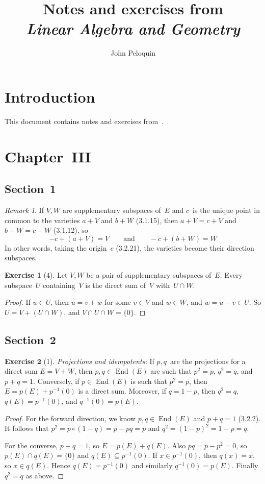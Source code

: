 \documentclass[letterpaper,12pt]{article}
\title{Notes and exercises from\\\textit{Linear Algebra and Geometry}}
\author{John Peloquin}
\date{}
\newcommand{\sect}{\cap}
\newcommand{\after}{\circ}
\DeclareMathOperator{\End}{End}
\newcommand{\inv}[1]{#1^{-1}}
\newcommand{\kerz}[1]{\inv{#1}(0)}
\theoremstyle{definition}
\newtheorem*{exer}{Exercise}
\theoremstyle{remark}
\newtheorem*{rmk}{Remark}
\begin{document}
\maketitle

\section*{Introduction}
This document contains notes and exercises from~\cite{dieudonne}.

\section*{Chapter~III}
\subsection*{Section~1}
\begin{rmk}
If \(V,W\) are supplementary subspaces of~\(E\) and \(c\)~is the unique point in common to the varieties \(a+V\) and \(b+W\) (3.1.15), then \(a+V=c+V\) and \(b+W=c+W\) (3.1.12), so
\[-c+(a+V)=V\qquad\text{and}\qquad -c+(b+W)=W\]
In other words, taking the origin~\(c\) (3.2.21), the varieties become their direction subspaces.
\end{rmk}

\begin{exer}[4]
Let \(V,W\) be a pair of supplementary subspaces of~\(E\). Every subspace~\(U\) containing~\(V\) is the direct sum of~\(V\) with~\(U\sect W\).
\end{exer}
\begin{proof}
If \(u\in U\), then \(u=v+w\) for some \(v\in V\) and \(w\in W\), and \(w=u-v\in U\). So \(U=V+(U\sect W)\), and \(V\sect U\sect W=\{0\}\).
\end{proof}

\subsection*{Section~2}
\begin{exer}[1]
\emph{Projections and idempotents:} If \(p,q\)~are the projections for a direct sum \(E=V+W\), then \(p,q\in\End(E)\) are such that \(p^2=p\), \(q^2=q\), and \(p+q=1\). Conversely, if \(p\in\End(E)\) is such that \(p^2=p\), then \(E=p(E)+\kerz{p}\) is a direct sum. Moreover, if \(q=1-p\), then \(q^2=q\), \(q(E)=\kerz{p}\), and \(\kerz{q}=p(E)\).
\end{exer}
\begin{proof}
For the forward direction, we know \(p,q\in\End(E)\) and \(p+q=1\) (3.2.2). It follows that \(p^2=p\after(1-q)=p-pq=p\) and \(q^2=(1-p)^2=1-p=q\).

For the converse, \(p+q=1\), so \(E=p(E)+q(E)\). Also \(pq=p-p^2=0\), so \(p(E)\sect q(E)=\{0\}\) and \(q(E)\subseteq\kerz{p}\). If \(x\in\kerz{p}\), then \(q(x)=x\), so \(x\in q(E)\). Hence \(q(E)=\kerz{p}\) and similarly \(\kerz{q}=p(E)\). Finally \(q^2=q\) as above.
\end{proof}
\end{document}
